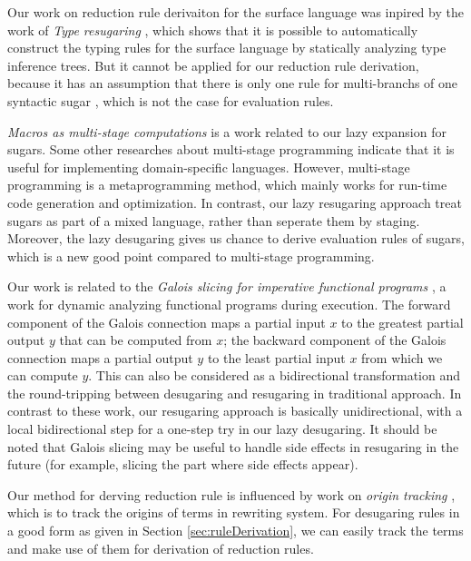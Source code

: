 Our work on reduction rule derivaiton for the surface language was inpired by the work of \emph{Type resugaring} \cite{resugaringtype}, which shows that it is possible to automatically construct the typing rules for the surface language by statically analyzing type inference trees. But it cannot be applied for our reduction rule derivation, because it has an assumption that there is only one rule for multi-branchs of one syntactic sugar , which is not the case for evaluation rules.


\emph{Macros as multi-stage computations} \cite{multistage} is a work related to our lazy expansion for sugars. Some other researches \cite{modularstaging} about multi-stage programming \cite{MSP} indicate that it is useful for implementing domain-specific languages. However, multi-stage programming is a metaprogramming method, which mainly works for run-time code generation and optimization. In contrast, our lazy resugaring approach treat sugars as part of a mixed language, rather than seperate them by staging. Moreover, the lazy desugaring gives us chance to derive evaluation rules of sugars, which is a new good point compared to multi-stage programming.

Our work is related to the \emph{Galois slicing for imperative functional programs} \cite{slicing}, a work for dynamic analyzing functional programs during execution. The forward component of the Galois connection maps a partial input $x$ to the greatest partial output $y$ that can be computed from $x$; the backward component of the Galois connection maps a partial output $y$ to the least partial input $x$ from which we can compute $y$.
This can also be considered as a bidirectional transformation \cite{bx,lens07} and the round-tripping between desugaring and resugaring in traditional approach. In contrast to these work, our resugaring approach is basically unidirectional, with a local bidirectional step
for a one-step try in our lazy desugaring. It should be noted that Galois slicing may be useful to handle side effects in resugaring in the future (for example, slicing the part where side effects appear).

Our method for derving reduction rule is influenced by work on \emph{origin tracking} \cite{origintracking}, which is to  track the origins of terms in rewriting system.
For desugaring rules in a good form as given in Section \ref{sec:ruleDerivation}, we can easily track the terms and make use of them for derivation of reduction rules. 
%

